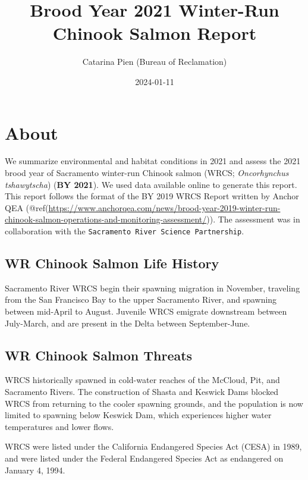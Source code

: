 \documentclass[
]{book}
\title{Brood Year 2021 Winter-Run Chinook Salmon Report}
\author{Catarina Pien (Bureau of Reclamation)}
\date{2024-01-11}
\theoremstyle{definition}
\theoremstyle{definition}
\theoremstyle{definition}
\theoremstyle{definition}
\theoremstyle{remark}
\begin{document}
\maketitle

{
\setcounter{tocdepth}{1}
\tableofcontents
}
\hypertarget{about}{%
\chapter{About}\label{about}}

We summarize environmental and habitat conditions in 2021 and assess the 2021 brood year of Sacramento winter-run Chinook salmon (WRCS; \emph{Oncorhynchus tshawytscha}) (\textbf{BY 2021}). We used data available online to generate this report. This report follows the format of the BY 2019 WRCS Report written by Anchor QEA (@ref(\url{https://www.anchorqea.com/news/brood-year-2019-winter-run-chinook-salmon-operations-and-monitoring-assessment/})). The assessment was in collaboration with the \texttt{Sacramento\ River\ Science\ Partnership}.

\hypertarget{wr-chinook-salmon-life-history}{%
\section{WR Chinook Salmon Life History}\label{wr-chinook-salmon-life-history}}

Sacramento River WRCS begin their spawning migration in November, traveling from the San Francisco Bay to the upper Sacramento River, and spawning between mid-April to August. Juvenile WRCS emigrate downstream between July-March, and are present in the Delta between September-June.

\hypertarget{wr-chinook-salmon-threats}{%
\section{WR Chinook Salmon Threats}\label{wr-chinook-salmon-threats}}

WRCS historically spawned in cold-water reaches of the McCloud, Pit, and Sacramento Rivers. The construction of Shasta and Keswick Dams blocked WRCS from returning to the cooler spawning grounds, and the population is now limited to spawning below Keswick Dam, which experiences higher water temperatures and lower flows.

WRCS were listed under the California Endangered Species Act (CESA) in 1989, and were listed under the Federal Endangered Species Act as endangered on January 4, 1994.
\end{document}

